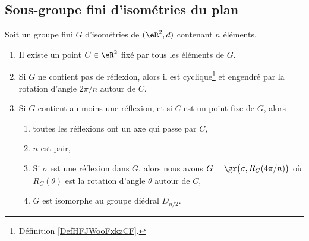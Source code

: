 \subsection{Sous-groupe fini d'isométries du plan}

\begin{theorem}       \label{THOooKDMUooUxQqbB}
	Soit un groupe fini \( G\) d'isométries de \( (\eR^2,d)\) contenant \( n \) éléments.
	\begin{enumerate}
		\item       \label{ITEMooYEONooCOMpeb}
		      Il existe un point \( C\in \eR^2\) fixé par tous les éléments de \( G\).
		\item       \label{ITEMooGELWooFFAqkc}
		      Si \( G\) ne contient pas de réflexion, alors il est cyclique\footnote{Définition \ref{DefHFJWooFxkzCF}.} et engendré par la rotation d'angle \( 2\pi/n\) autour de \( C\).
		\item       \label{ITEMooDHKEooFpCfmX}
		      Si \( G\) contient au moins une réflexion, et si \( C\) est un point fixe de \( G\), alors
		      \begin{enumerate}
			      \item       \label{ITEMooGQZTooJIPPLtyf}
			            toutes les réflexions ont un axe qui passe par \( C\),
			      \item       \label{ITEMooKPQRooLquSiQ}
			            \( n\) est pair,
			      \item       \label{ITEMooCHSWooHpDGHf}
			            Si \( \sigma\) est une réflexion dans \( G\), alors nous avons $G=\gr\big(\sigma,R_C(4\pi/n)\big)$ où \( R_C(\theta)  \) est la rotation d'angle \( \theta\) autour de \( C\),
			      \item       \label{ITEMooROUYooRghvMv}
			            \( G\) est isomorphe au groupe diédral \( D_{n/2}\).
		      \end{enumerate}
	\end{enumerate}
\end{theorem}

